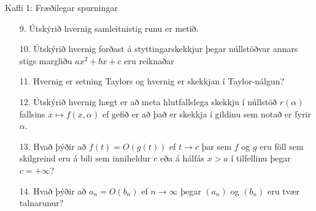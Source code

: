 \begin{frame}{Kafli 1: Fræðilegar spurningar}
  \begin{enumerate}
  \item[9.] Útskýrið hvernig samleitnistig runu er metið.
  \item[10.] Útskýrið hvernig forðast á styttingarskekkjur þegar
    núllstöðvar annars stigs margliðu $ax^2+bx+c$ eru reiknaðar
  \item[11.]  Hvernig er setning Taylors og hvernig er skekkjan í
    Taylor-nálgun?
  \item[12.]   Útskýrið hvernig hægt er að meta hlutfallslega skekkju
    í núllstöð $r(\alpha)$ fallsins $x\mapsto f(x,\alpha)$ ef gefið er
    að það er skekkja í gildinu sem notað er fyrir $\alpha$. 
  \item[13.]  Hvað þýðir að $f(t) = O(g(t))$ ef $t \rightarrow c$ þar
    sem $f$ og $g$ eru föll sem skilgreind eru á bili sem inniheldur
    $c$ eða á hálfás $x>a$ í tilfellinu þegar $c=+\infty$?
% 
  \item[14.]  Hvað þýðir að $ a_n = O(b_n)$ ef $n\to \infty$ þegar
 $(a_n)$ og $(b_n)$ eru tvær talnarunur?
    \end{enumerate}
\end{frame}
%

